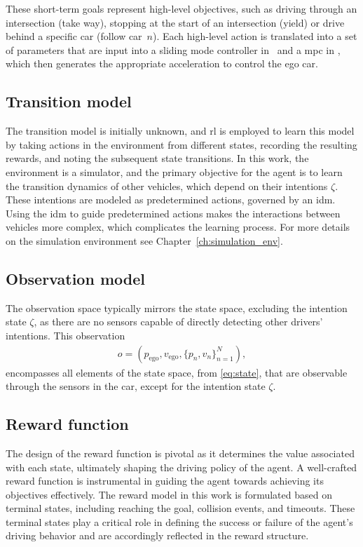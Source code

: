 These short-term goals represent high-level objectives, such as driving through an intersection (take way), stopping at the start of an intersection (yield) or drive behind a specific car (follow car~$n$). Each high-level action is translated into a set of parameters that are input into a sliding mode controller in \paperLSTM \ and a \gls{mpc} in \paperMPC, which then generates the appropriate acceleration to control the ego car.

\subsection{Transition model}
\label{sec:pomdp_transistionmodel}
The transition model is initially unknown, and \gls{rl} is employed to learn this model by taking actions in the environment from different states, recording the resulting rewards, and noting the subsequent state transitions. In this work, the environment is a simulator, and the primary objective for the agent is to learn the transition dynamics of other vehicles, which depend on their intentions $\zeta$. These intentions are modeled as predetermined actions, governed by an \gls{idm}. Using the \gls{idm} to guide predetermined actions makes the interactions between vehicles more complex, which complicates the learning process. For more details on the simulation environment see Chapter~\ref{ch:simulation_env}.


\subsection{Observation model}
The observation space typically mirrors the state space, excluding the intention state $\zeta$, as there are no sensors capable of directly detecting other drivers' intentions. This observation 
\begin{align}
	o = (p_\mathrm{ego}, v_\mathrm{ego}, \{p_{n}, v_n\}_{n=1}^N), 
	\label{eq:observation}
\end{align}
encompasses all elements of the state space, from \eqref{eq:state}, that are observable through the sensors in the car, except for the intention state $\zeta$.

\subsection{Reward function}
The design of the reward function is pivotal as it determines the value associated with each state, ultimately shaping the driving policy of the agent. A well-crafted reward function is instrumental in guiding the agent towards achieving its objectives effectively.
The reward model in this work is formulated based on terminal states, including reaching the goal, collision events, and timeouts. These terminal states play a critical role in defining the success or failure of the agent's driving behavior and are accordingly reflected in the reward structure.

